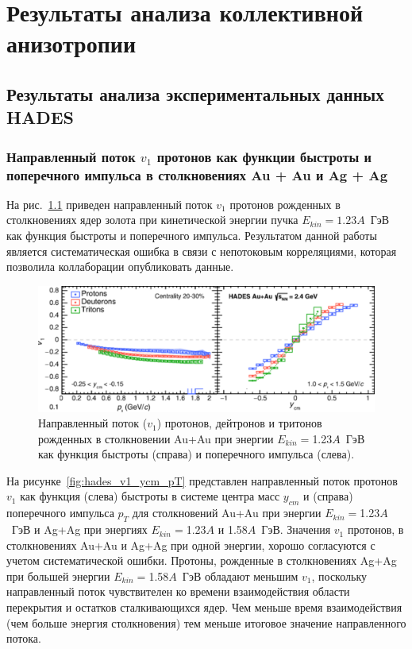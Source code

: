 \chapter{Результаты анализа коллективной анизотропии}

\section{Результаты анализа экспериментальных данных HADES}

\subsection{Направленный поток $v_1$ протонов как функции быстроты и поперечного импульса в столкновениях Au + Au и Ag + Ag}

На рис.~\ref{fig:hades_prl} приведен направленный поток $v_1$ протонов рожденных в столкновениях ядер золота при кинетической энергии пучка $E_{kin}=1.23A$~ГэВ как функция быстроты и поперечного импульса.
Результатом данной работы является систематическая ошибка в связи с непотоковым корреляциями, которая позволила коллаборации опубликовать данные.
%
\begin{figure}[ht]
\begin{center}
\includegraphics[width=0.75\linewidth]{images/HADES_prl.png}
\caption{Направленный поток ($v_1$) протонов, дейтронов и тритонов  рожденных в столкновении Au+Au при энергии $E_{kin}=$1.23$A$~ГэВ как функция быстроты (справа) и поперечного импульса (слева).}
\label{fig:hades_prl}
\end{center}
\end{figure}

На рисунке~\ref{fig:hades_v1_ycm_pT} представлен направленный поток протонов $v_1$ как функция (слева) быстроты в системе центра масс $y_{cm}$ и (справа) поперечного импульса $p_T$ для столкновений Au+Au при энергии $E_{kin}=$1.23$A$~ГэВ и Ag+Ag при энергиях $E_{kin}=$1.23$A$ и 1.58$A$~ГэВ.
Значения $v_1$ протонов, в столкновениях Au+Au и Ag+Ag при одной энергии, хорошо согласуются с учетом систематической ошибки. 
Протоны, рожденные в столкновениях Ag+Ag при большей энергии $E_{kin}=$1.58$A$~ГэВ обладают меньшим $v_1$, поскольку направленный поток чувствителен ко времени взаимодействия области перекрытия и остатков сталкивающихся ядер.
Чем меньше время взаимодействия (чем больше энергия столкновения) тем меньше итоговое значение направленного потока.

